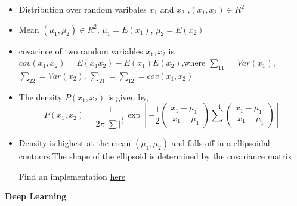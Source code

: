 \documentclass[12pt]{article}
\begin{document}
\begin{itemize}
\item	Distribution over random varibales $x_{1}$ and $x_{2}$ ,$(x_{1} ,  x_{2})\in R^{2}$
	
\item	Mean $(\mu_{1},\mu _{2}) \in R^{2}$,  $ \mu_{1}=E(x_{1})$,  $\mu_{2}=E(x_{2})$
	
\item	covarince of two random variables $x_{1},x_{2}$ is : $cov(x_{1},x_{2})=E(x_{1}x_{2})-E(x_{1})E(x_{2})$,where $\sum_{11}=Var(x_{1})$, $\sum_{22}=Var(x_{2})$, $\sum_{21}=\sum_{12}=cov(x_{1},x_{2})$
	
\item	The density $P(x_{1},x_{2})$ is given by, $$P(x_{1},x_{2})=\frac{1}{2\pi \vert \sum \vert ^{\frac{1}{2}}} \exp[-\frac{1}{2} \left({\begin{array}{cc}{x_{1}-\mu_{1}}\\\ {x_{1}-\mu_{1}}\end{array}}\right) \sum^{-1} \left({\begin{array}{cc}{x_{1}-\mu_{1}}\\\ {x_{1}-\mu_{1}}\end{array}}\right)]$$
	
\item Density is highest at the mean $(\mu_{1},\mu_{2})$ and falls off in a ellipsoidal contours.The shape of the ellipsoid is determined by the covariance matrix
	

Find an implementation \href{https://github.com/aswin16/ML-REPORT/blob/master/codes/winery-multivariate/winery-classification-gaussian.ipynb}{here}
	
	
\end{itemize}



\cleardoublepage

	\enlargethispage{2cm}

\begin{center}
	
	\vspace*{-1cm}
	
	\textbf{\Large Deep Learning     }\\[10pt]
	
	
	
	
\end{center}

\cleardoublepage







 








 
\end{document}
